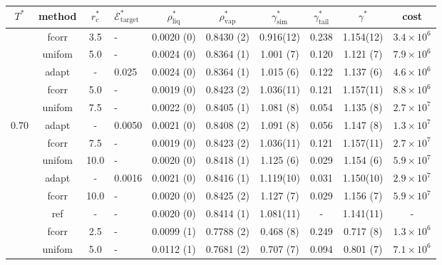 \documentclass[aps,pre,preprint]{revtex4}
\begin{document}
\begin{table}
  \centering
  \begin{tabular*}{0.99\textwidth}{c|c|@{\extracolsep{\fill}}clcccccc}\hline\hline
    $T^\ast$ & \textrm{method} &$r^\ast_{c}$ & $\mathcal E^\ast_{\textrm{target}}$  & $\rho^\ast_{\textrm{liq}}$ & $\rho^\ast_{\textrm{vap}}$ & $\gamma^\ast_{\textrm{sim}}$ & $\gamma^\ast_{\textrm{tail}}$ & $\gamma^\ast$ & cost\\\hline
    & \textrm{fcorr}  & 3.5     & -       & 0.0020 (0) & 0.8430 (2) & 0.916(12) & 0.238 & 1.154(12) & $3.4\times 10^6$\\\cline{2-10}
    & \textrm{unifom} & 5.0     & -       & 0.0024 (0) & 0.8364 (1) & 1.001 (7) & 0.120 & 1.121 (7) & $7.9\times 10^6$\\
    & \textrm{adapt}  & -       & 0.025   & 0.0024 (0) & 0.8364 (1) & 1.015 (6) & 0.122 & 1.137 (6) & $4.6\times 10^6$\\
    & \textrm{fcorr}  & 5.0     & -       & 0.0019 (0) & 0.8423 (2) & 1.036(11) & 0.121 & 1.157(11) & $8.8\times 10^6$\\\cline{2-10}
    & \textrm{unifom} & 7.5     & -       & 0.0022 (0) & 0.8405 (1) & 1.081 (8) & 0.054 & 1.135 (8) & $2.7\times 10^7$\\
0.70& \textrm{adapt}  & -       & 0.0050  & 0.0021 (0) & 0.8408 (2) & 1.091 (8) & 0.056 & 1.147 (8) & $1.3\times 10^7$\\
    & \textrm{fcorr}  & 7.5     & -       & 0.0019 (0) & 0.8423 (2) & 1.036(11) & 0.121 & 1.157(11) & $2.7\times 10^7$\\\cline{2-10}
    & \textrm{unifom} & 10.0    & -       & 0.0020 (0) & 0.8418 (1) & 1.125 (6) & 0.029 & 1.154 (6) & $5.9\times 10^7$\\
    & \textrm{adapt}  & -       & 0.0016  & 0.0021 (0) & 0.8416 (1) & 1.119(10) & 0.031 & 1.150(10) & $2.9\times 10^7$\\
    & \textrm{fcorr}  & 10.0    & -       & 0.0020 (0) & 0.8425 (2) & 1.127 (7) & 0.029 & 1.156 (7) & $5.9\times 10^7$\\\cline{2-10}
    & \textrm{ref}    & -       & -       & 0.0020 (0) & 0.8414 (1) & 1.081(11) & -     & 1.141(11) & - \\    \hline\hline
    & \textrm{fcorr}  & 2.5     & -       & 0.0099 (1) & 0.7788 (2) & 0.468 (8) & 0.249 & 0.717 (8) & $1.3\times 10^6$\\\cline{2-10}
    & \textrm{unifom} & 5.0     & -       & 0.0112 (1) & 0.7681 (2) & 0.707 (7) & 0.094 & 0.801 (7) & $7.1\times 10^6$\\

\end{tabular*}
\end{table}
\end{document}
